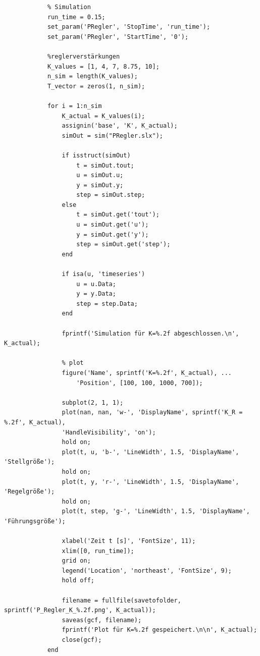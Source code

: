 \begin{sourcecode}[H]
    \caption{\textit{Matlab}-Code zur Simulation mit verschiedenen Reglerverstärkungen}
    \begin{verbatim}
            % Simulation
            run_time = 0.15;
            set_param('PRegler', 'StopTime', 'run_time');
            set_param('PRegler', 'StartTime', '0');
            
            %reglerverstärkungen
            K_values = [1, 4, 7, 8.75, 10];
            n_sim = length(K_values);
            T_vector = zeros(1, n_sim);

            for i = 1:n_sim
                K_actual = K_values(i);
                assignin('base', 'K', K_actual); 
                simOut = sim("PRegler.slx");
                
                if isstruct(simOut)
                    t = simOut.tout;
                    u = simOut.u;
                    y = simOut.y;
                    step = simOut.step;
                else
                    t = simOut.get('tout');
                    u = simOut.get('u');
                    y = simOut.get('y');
                    step = simOut.get('step');
                end
                
                if isa(u, 'timeseries')
                    u = u.Data;
                    y = y.Data;
                    step = step.Data;
                end
                
                fprintf('Simulation für K=%.2f abgeschlossen.\n', K_actual);

                % plot
                figure('Name', sprintf('K=%.2f', K_actual), ...
                    'Position', [100, 100, 1000, 700]);
                
                subplot(2, 1, 1);
                plot(nan, nan, 'w-', 'DisplayName', sprintf('K_R = %.2f', K_actual), 
                'HandleVisibility', 'on');
                hold on;
                plot(t, u, 'b-', 'LineWidth', 1.5, 'DisplayName', 'Stellgröße');
                hold on;
                plot(t, y, 'r-', 'LineWidth', 1.5, 'DisplayName', 'Regelgröße');
                hold on;
                plot(t, step, 'g-', 'LineWidth', 1.5, 'DisplayName', 'Führungsgröße');

                xlabel('Zeit t [s]', 'FontSize', 11);
                xlim([0, run_time]);
                grid on;
                legend('Location', 'northeast', 'FontSize', 9);
                hold off;
                
                filename = fullfile(savetofolder, sprintf('P_Regler_K_%.2f.png', K_actual));
                saveas(gcf, filename);
                fprintf('Plot für K=%.2f gespeichert.\n\n', K_actual);
                close(gcf);
            end                        
        \end{verbatim}
    \label{code_2a}
\end{sourcecode}
\newpage

